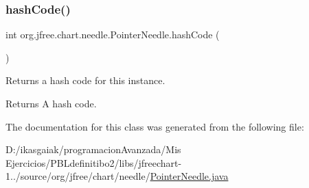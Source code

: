 \subsubsection{\texorpdfstring{hash\+Code()}{hashCode()}}
{\footnotesize\ttfamily int org.\+jfree.\+chart.\+needle.\+Pointer\+Needle.\+hash\+Code (\begin{DoxyParamCaption}{ }\end{DoxyParamCaption})}

Returns a hash code for this instance.

\begin{DoxyReturn}{Returns}
A hash code. 
\end{DoxyReturn}


The documentation for this class was generated from the following file\+:\begin{DoxyCompactItemize}
\item 
D\+:/ikasgaiak/programacion\+Avanzada/\+Mis Ejercicios/\+P\+B\+Ldefinitibo2/libs/jfreechart-\/1../source/org/jfree/chart/needle/\mbox{\hyperlink{_pointer_needle_8java}{Pointer\+Needle.\+java}}\end{DoxyCompactItemize}
